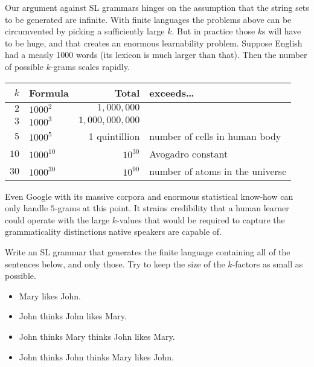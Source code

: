 Our argument against SL grammars hinges on the assumption that the string sets to be generated are infinite.
With finite languages the problems above can be circumvented by picking a sufficiently large $k$.
But in practice those $k$s will have to be huge, and that creates an enormous learnability problem.
Suppose English had a measly 1000 words (its lexicon is much larger than that).
Then the number of possible $k$-grams scales rapidly.
%
\begin{center}
    \begin{tabular}{rlrl}
        \toprule
        $k$ & \textbf{Formula} & \textbf{Total} & \textbf{exceeds\ldots}\\
        \midrule
        $2$ & $1000^2$ & $1,000,000$\\
        $3$ & $1000^3$ & $1,000,000,000$\\
        $5$ & $1000^5$ & 1 quintillion & number of cells in human body\\
        $10$ & $1000^{10}$ & $10^{30}$ & Avogadro constant\\
        $30$ & $1000^{30}$ & $10^{90}$ & number of atoms in the universe\\
        \bottomrule
    \end{tabular}
\end{center}
%
Even Google with its massive corpora and enormous statistical know-how can only handle $5$-grams at this point.
It strains credibility that a human learner could operate with the large $k$-values that would be required to capture the grammaticality distinctions native speakers are capable of.

\begin{exercise}
    Write an SL grammar that generates the finite language containing all of the sentences below, and only those.
    Try to keep the size of the $k$-factors as small as possible.
    \begin{itemize}
        \item Mary likes John.
        \item John thinks John likes Mary.
        \item John thinks Mary thinks John likes Mary.
        \item John thinks John thinks Mary likes John.
    \end{itemize}
\end{exercise}

